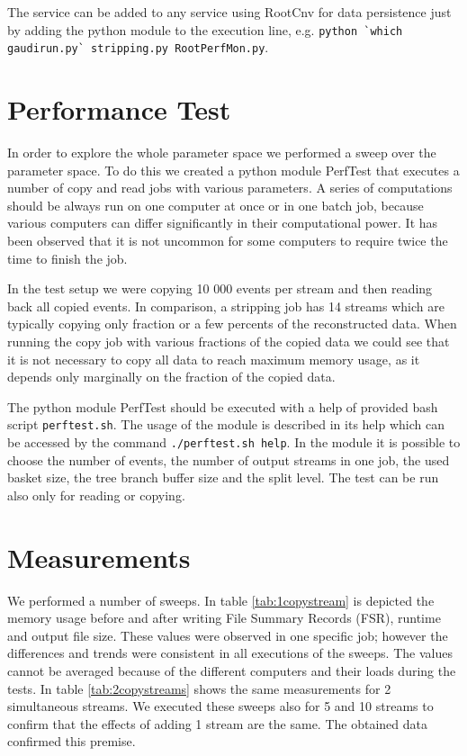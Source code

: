 \documentclass[pdftex,a4paper]{article}
\begin{document}
The service can be added to any service using RootCnv for data persistence just by adding the python module to the execution line, e.g. \verb|python `which gaudirun.py` stripping.py RootPerfMon.py|.

\section{Performance Test}
\label{sec:perftest}
In order to explore the whole parameter space we performed a sweep over the parameter space. To do this we created a python module PerfTest that executes a number of copy and read jobs with various parameters. A series of computations should be always run on one computer at once or in one batch job, because various computers can differ significantly in their computational power. It has been observed that it is not uncommon for some computers to require twice the time to finish the job.

In the test setup we were copying 10 000 events per stream and then reading back all copied events. In comparison, a stripping job has 14 streams which are typically copying only fraction or a few percents of the reconstructed data. When running the copy job with various fractions of the copied data we could see that it is not necessary to copy all data to reach maximum memory usage, as it depends only marginally on the fraction of the copied data.

The python module PerfTest should be executed with a help of provided bash script \verb|perftest.sh|. The usage of the module is described in its help which can be accessed by the command \verb|./perftest.sh help|. In the module it is possible to choose the number of events, the number of output streams in one job, the used basket size, the tree branch buffer size and the split level. The test can be run also only for reading or copying.

\section{Measurements}
\label{sec:measurements}
We performed a number of sweeps. In table \ref{tab:1copystream} is depicted the memory usage before and after writing File Summary Records (FSR), runtime and output file size. These values were observed in one specific job; however the differences and trends were consistent in all executions of the sweeps. The values cannot be averaged because of the different computers and their loads during the tests. In table \ref{tab:2copystreams} shows the same measurements for 2 simultaneous streams. We executed these sweeps also for 5 and 10 streams to confirm that the effects of adding 1 stream are the same. The obtained data confirmed this premise.
\end{document}
